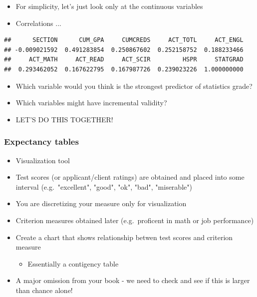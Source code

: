\documentclass[dvipsnames]{beamer}\usepackage[]{graphicx}\usepackage[]{color}
\makeatletter
\newenvironment{kframe}{%
 \def\at@end@of@kframe{}%
 \ifinner\ifhmode%
  \def\at@end@of@kframe{\end{minipage}}%
  \begin{minipage}{\columnwidth}%
 \fi\fi%
 \def\FrameCommand##1{\hskip\@totalleftmargin \hskip-\fboxsep
 \colorbox{shadecolor}{##1}\hskip-\fboxsep
     \hskip-\linewidth \hskip-\@totalleftmargin \hskip\columnwidth}%
 \MakeFramed {\advance\hsize-\width
   \@totalleftmargin\z@ \linewidth\hsize
   \@setminipage}}%
 {\par\unskip\endMakeFramed%
 \at@end@of@kframe}
\newenvironment{knitrout}{}{} %
\makeatother
\begin{document}
\begin{frame}[fragile]
\begin{itemize}
\item For simplicity, let's just look only at the continuous variables
\item Correlations ... 
\end{itemize}
\begin{knitrout}\scriptsize
{}\color{fgcolor}\begin{kframe}
\begin{verbatim}
##      SECTION      CUM_GPA     CUMCREDS     ACT_TOTL     ACT_ENGL 
## -0.009021592  0.491283854  0.250867602  0.252158752  0.188233466 
##     ACT_MATH     ACT_READ     ACT_SCIR         HSPR     STATGRAD 
##  0.293462052  0.167622795  0.167987726  0.239023226  1.000000000
\end{verbatim}
\end{kframe}
\end{knitrout}
\begin{itemize}
\item<2-> Which variable would you think is the strongest predictor of statistics grade? 
\item<3-> Which variables might have incremental validity?
\item<4-> LET'S DO THIS TOGETHER!
\end{itemize}
\end{frame}

\begin{frame}
  \frametitle{Expectancy tables}
\begin{itemize}
  \item Visualization tool
  \item Test scores (or applicant/client ratings) are obtained and placed into some interval (e.g.\ "excellent", "good", "ok", "bad", "miserable")
  \item You are discretizing your measure only for visualization
  \item Criterion measures obtained later (e.g.\ proficent in math or job performance)
  \item Create a chart that shows relationship betwen test scores and criterion measure
    \begin{itemize}
      \item Essentially a contigency table
    \end{itemize}
  \item<2-> A major omission from your book - \textcolor{wared}{we need to check and see if this is larger than chance alone!}
\end{itemize}
\end{frame}
\end{document}
